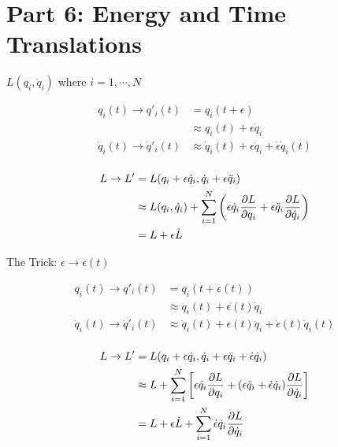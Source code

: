 \documentclass{article}
\begin{document}
\section*{Part 6: Energy and Time Translations}

$L(q_i,\dot{q}_i)$ where $i=1,\cdots,N$

\begin{align*}
    q_i(t)\to q'_i(t)             & =q_i(t+\epsilon)                                                      \\
                                  & \approx q_i(t)+\epsilon\dot{q}_i                                      \\
    \dot{q}_i(t)\to \dot{q}'_i(t) & \approx \dot{q}_i(t)+\epsilon\ddot{q}_i +\dot{\epsilon}  \dot{q}_i(t) \\
\end{align*}

\begin{align*}
    L\to L' & =L(q_i+\epsilon \dot{q}_i,\dot{q}_i+\epsilon \ddot{q}_i)                                                          \\
            & \approx L(q_i,\dot{q}_i)+\sum_{i=1}^N \pqty{\epsilon\dot{q}_i \pdv{L}{q_i}+\epsilon\ddot{q}_i \pdv{L}{\dot{q}_i}} \\
            & =L+\epsilon \dot{L}
\end{align*}

The Trick: $\epsilon\to\epsilon(t)$

\begin{align*}
    q_i(t)\to q'_i(t)             & =q_i(t+\epsilon(t))                                                         \\
                                  & \approx q_i(t)+\epsilon(t)\dot{q}_i                                         \\
    \dot{q}_i(t)\to \dot{q}'_i(t) & \approx \dot{q}_i(t)+\epsilon(t)\ddot{q}_i +\dot{\epsilon}(t)  \dot{q}_i(t) \\
\end{align*}

\begin{align*}
    L\to L' & =L(q_i+\epsilon\dot{q}_i,\dot{q}_i+\epsilon\ddot{q}_i +\dot{\epsilon}  \dot{q}_i)                                                   \\
            & \approx L+\sum_{i=1}^N \bqty{\epsilon\dot{q}_i \pdv{L}{q_i}+\pqty{\epsilon\ddot{q}_i+\dot{\epsilon}  \dot{q}_i }\pdv{L}{\dot{q}_i}} \\
            & =L+\epsilon \dot{L}+\sum_{i=1}^N \dot{\epsilon}  \dot{q}_i \pdv{L}{\dot{q}_i}
\end{align*}
\end{document}
